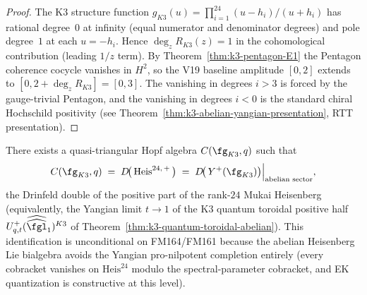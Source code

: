 \begin{proof}
The K$3$ structure function $g_{K3}(u) = \prod_{i=1}^{24}(u-h_i)/(u+h_i)$
has rational degree~$0$ at infinity \textup{(}equal numerator and
denominator degrees\textup{)} and pole degree~$1$ at each
$u = -h_i$.  Hence $\deg_z R_{K3}(z) = 1$ in the cohomological
contribution \textup{(}leading $1/z$ term\textup{).}  By
Theorem~\ref{thm:k3-pentagon-E1} the Pentagon coherence cocycle
vanishes in $H^2$, so the V19 baseline amplitude $[0, 2]$ extends to
$[0, 2 + \deg_z R_{K3}] = [0, 3]$.  The vanishing in degrees $i > 3$
is forced by the gauge-trivial Pentagon, and the vanishing in degrees
$i < 0$ is the standard chiral Hochschild positivity \textup{(}see
Theorem~\ref{thm:k3-abelian-yangian-presentation}, RTT
presentation\textup{).}
\end{proof}

\begin{corollary}
\label{cor:cy-c-k3-abelian-from-pentagon}
\ClaimStatusProvedHere
There exists a quasi-triangular Hopf algebra $C(\fg_{K3}, q)$ such that
\[
  C(\fg_{K3}, q)
   \;=\; D\!\bigl(\,\mathrm{Heis}^{24,\,+}\,\bigr)
   \;=\; D\!\bigl(\,Y^+(\fg_{K3})\bigr)\Big|_{\text{abelian sector}},
\]
the Drinfeld double of the positive part of the rank-$24$ Mukai
Heisenberg \textup{(}equivalently, the Yangian limit
$t \to 1$ of the K$3$ quantum toroidal positive half
$U^+_{q,t}(\widehat{\widehat{\fgl}}_1)^{K3}$ of
Theorem~\ref{thm:k3-quantum-toroidal-abelian}\textup{).}  This
identification is unconditional on FM164/FM161 because the abelian
Heisenberg Lie bialgebra avoids the Yangian pro-nilpotent completion
entirely \textup{(}every cobracket vanishes on $\mathrm{Heis}^{24}$
modulo the spectral-parameter cobracket, and EK quantization is
constructive at this level\textup{).}
\end{corollary}

